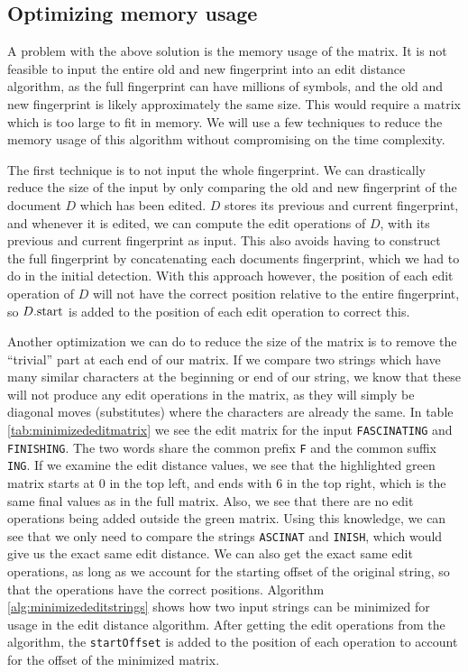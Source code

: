 \subsection*{Optimizing memory usage}

A problem with the above solution is the memory usage of the matrix. It is not feasible to
input the entire old and new fingerprint into an edit distance algorithm, as the full
fingerprint can have millions of symbols, and the old and new fingerprint is likely
approximately the same size. This would require a matrix which is too large to fit in
memory. We will use a few techniques to reduce the memory usage of this algorithm without
compromising on the time complexity.

The first technique is to not input the whole fingerprint. We can drastically reduce the
size of the input by only comparing the old and new fingerprint of the document $D$ which
has been edited. $D$ stores its previous and current fingerprint, and whenever it is
edited, we can compute the edit operations of $D$, with its previous and current
fingerprint as input. This also avoids having to construct the full fingerprint by
concatenating each documents fingerprint, which we had to do in the initial detection.
With this approach however, the position of each edit operation of $D$ will not have the
correct position relative to the entire fingerprint, so ${{D}.{\mathrm{start}}}$ is added
to the position of each edit operation to correct this.

Another optimization we can do to reduce the size of the matrix is to remove the
``trivial'' part at each end of our matrix. If we compare two strings which have many
similar characters at the beginning or end of our string, we know that these will not
produce any edit operations in the matrix, as they will simply be diagonal moves
(substitutes) where the characters are already the same. In table
\ref{tab:minimizededitmatrix} we see the edit matrix for the input \verb|FASCINATING| and
\verb|FINISHING|. The two words share the common prefix \verb|F| and the common suffix
\verb|ING|. If we examine the edit distance values, we see that the highlighted green
matrix starts at $0$ in the top left, and ends with $6$ in the top right, which is the
same final values as in the full matrix. Also, we see that there are no edit operations
being added outside the green matrix. Using this knowledge, we can see that we only need
to compare the strings \verb|ASCINAT| and \verb|INISH|, which would give us the exact same
edit distance. We can also get the exact same edit operations, as long as we account for
the starting offset of the original string, so that the operations have the correct
positions. Algorithm \ref{alg:minimizededitstrings} shows how two input strings can be
minimized for usage in the edit distance algorithm. After getting the edit operations from
the algorithm, the \verb|startOffset| is added to the position of each operation to
account for the offset of the minimized matrix.

